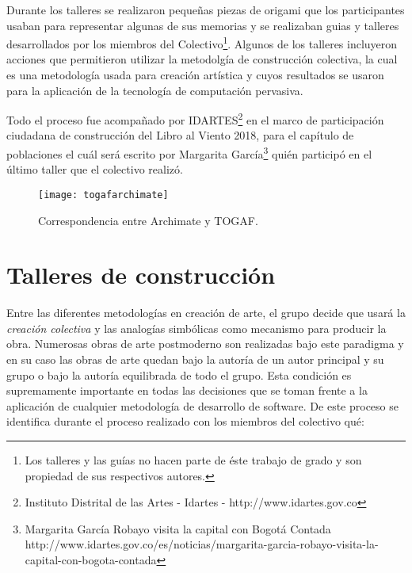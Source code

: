 Durante los talleres se realizaron pequeñas piezas de origami que los participantes usaban para representar algunas de sus memorias y se realizaban guias y talleres desarrollados por los miembros del Colectivo\footnote{Los talleres y las guías no hacen parte de éste trabajo de grado y son propiedad de sus respectivos autores.}. Algunos de los talleres incluyeron acciones que permitieron utilizar la metodolgía de construcción colectiva, la cual es una metodología usada para creación artística y cuyos resultados se usaron para la aplicación de la tecnología de computación pervasiva.

Todo el proceso fue acompañado por IDARTES\footnote{Instituto Distrital de las Artes - Idartes - http://www.idartes.gov.co} en el marco de participación ciudadana de construcción del Libro al Viento 2018, para el capítulo de poblaciones el cuál será escrito por Margarita García\cite{idartesmargarita}\footnote{Margarita García Robayo visita la capital con Bogotá Contada http://www.idartes.gov.co/es/noticias/margarita-garcia-robayo-visita-la-capital-con-bogota-contada} quién participó en el último taller que el colectivo realizó.

\begin{figure}[h]\label{togafarchimate}
\centering
\texttt{[image: togafarchimate]}
\caption{Correspondencia entre Archimate y TOGAF.}
\end{figure}

\section{Talleres de construcción}

Entre las diferentes metodologías en creación de arte, el grupo decide que usará la \textit{creación colectiva}\cite{casacuberta2003creacion} y las analogías simbólicas\cite{garcia2003idea} como mecanismo para producir la obra. Numerosas obras de arte postmoderno son realizadas bajo este paradigma y en su caso las obras de arte quedan bajo la autoría de un autor principal y su grupo o bajo la autoría equilibrada de todo el grupo. Esta condición es supremamente importante en todas las decisiones que se toman frente a la aplicación de cualquier metodología de desarrollo de software. De este proceso se identifica durante el proceso realizado con los miembros del colectivo qué:

